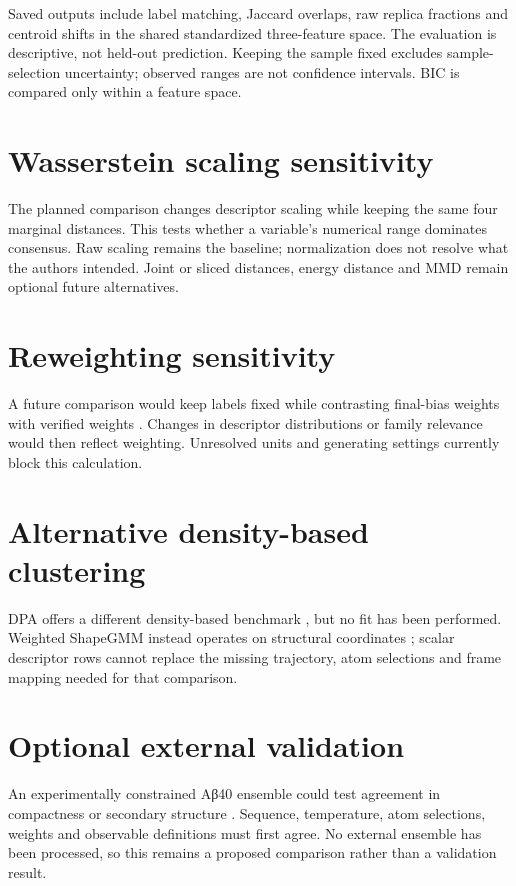 Saved outputs include label matching, Jaccard overlaps, raw replica fractions and centroid shifts in the shared standardized three-feature space. The evaluation is descriptive, not held-out prediction. Keeping the sample fixed excludes sample-selection uncertainty; observed ranges are not confidence intervals. BIC is compared only within a feature space.

\section{Wasserstein scaling sensitivity}
The planned comparison changes descriptor scaling while keeping the same four marginal distances. This tests whether a variable's numerical range dominates consensus. Raw scaling remains the baseline; normalization does not resolve what the authors intended. Joint or sliced distances, energy distance and MMD remain optional future alternatives.

\section{Reweighting sensitivity}
A future comparison would keep labels fixed while contrasting final-bias weights with verified  weights \autocite{tiwary2015,bonomi2009,plumedreweight}. Changes in descriptor distributions or family relevance would then reflect weighting. Unresolved units and generating settings currently block this calculation.

\section{Alternative density-based clustering}
DPA offers a different density-based benchmark \autocite{derrico2021}, but no fit has been performed. Weighted ShapeGMM instead operates on structural coordinates \autocite{sasmal2024}; scalar descriptor rows cannot replace the missing trajectory, atom selections and frame mapping needed for that comparison.

\section{Optional external validation}
An experimentally constrained Aβ40 ensemble could test agreement in compactness or secondary structure \autocite{borthakur2025}. Sequence, temperature, atom selections, weights and observable definitions must first agree. No external ensemble has been processed, so this remains a proposed comparison rather than a validation result.
